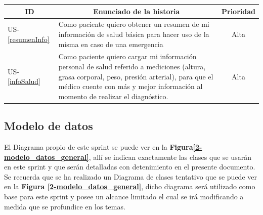 \begin{table}[h]
    \centering
	\begin{tabular}{|l|p{9cm}|c|}
	\hline
        \multicolumn{1}{|c|}{\textbf{ID}} &
        \multicolumn{1}{|c|}{\textbf{Enunciado de la historia}} &
        \textbf{Prioridad} \\          
    \hline
        US-\ref{resumenInfo} &
        Como paciente quiero obtener un resumen de mi información de salud básica para hacer uso de la misma en caso de una emergencia &Alta
        \\
    \hline 
	    US-\ref{infoSalud} &
        Como paciente quiero cargar mi información personal de salud referido a mediciones (altura, grasa corporal, peso, presión arterial), para que el médico cuente con más y mejor información al momento de realizar el diagnóstico. & Alta
        \\
    \hline
    \end{tabular}
    \label{US-Sprint2}
\end{table}

\subsection{Modelo de datos}
El Diagrama propio de este sprint se puede ver en la \textbf{Figura\ref{2-modelo_datos_general}}, allí se indican exactamente las clases que se usarán en este sprint y que serán detalladas con detenimiento en el presente documento. Se recuerda que se ha realizado un Diagrama de clases tentativo que se puede ver en la \textbf{Figura \ref{2-modelo_datos_general}}, dicho diagrama  será utilizado como base para este sprint y posee un alcance limitado el cual se irá modificando a medida que se profundice en los temas.



